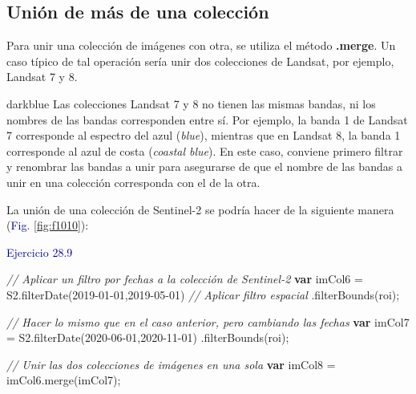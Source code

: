\documentclass[
  12pt,
  letterpaper,
  twoside]{book}
\newenvironment{Shaded}{\begin{snugshade}}{\end{snugshade}}
\newcommand{\CommentTok}[1]{\textcolor[rgb]{0.24,0.58,0.00}{\textit{#1}}}
\newcommand{\FunctionTok}[1]{\textcolor[rgb]{0.48,0.12,0.64}{#1}}
\newcommand{\KeywordTok}[1]{\textcolor[rgb]{0.00,0.00,0.00}{\textbf{#1}}}
\newcommand{\NormalTok}[1]{#1}
\newcommand{\OperatorTok}[1]{\textcolor[rgb]{0.00,0.00,0.00}{#1}}
\newcommand{\StringTok}[1]{\textcolor[rgb]{0.87,0.29,0.22}{#1}}
\newcommand\boldpurple[1]{\textcolor{darkpurple}{\textbf{#1}}}
\begin{document}
\hypertarget{uniuxf3n-de-muxe1s-de-una-colecciuxf3n}{%
\subsection*{Unión de más de una colección}\label{uniuxf3n-de-muxe1s-de-una-colecciuxf3n}}

Para unir una colección de imágenes con otra, se utiliza el método \boldpurple{.merge}. Un caso típico de tal operación sería unir dos colecciones de Landsat, por ejemplo, Landsat 7 y 8.

\begin{bluebox2}

\begin{awesomeblock}{5pt}{\faLightbulb}{darkblue}
Las colecciones Landsat 7 y 8 no tienen las mismas bandas, ni los nombres de las bandas corresponden entre sí. Por ejemplo, la banda 1 de Landsat 7 corresponde al espectro del azul (\emph{blue}), mientras que en Landsat 8, la banda 1 corresponde al azul de costa (\emph{coastal blue}). En este caso, conviene primero filtrar y renombrar las bandas a unir para asegurarse de que el nombre de las bandas a unir en una colección corresponda con el de la otra.

\end{awesomeblock}

\end{bluebox2}

La unión de una colección de Sentinel-2 se podría hacer de la siguiente manera (\textcolor{darkblue}{Fig.} \ref{fig:f1010}):

\textcolor{darkblue}{Ejercicio 28.9}

\begin{Shaded}
\begin{Highlighting}[]
\CommentTok{// Aplicar un filtro por fechas a la colección de Sentinel{-}2}
\KeywordTok{var}\NormalTok{ imCol6 }\OperatorTok{=}\NormalTok{ S2}\OperatorTok{.}\FunctionTok{filterDate}\NormalTok{(}\StringTok{\textquotesingle{}2019{-}01{-}01\textquotesingle{}}\OperatorTok{,}\StringTok{\textquotesingle{}2019{-}05{-}01\textquotesingle{}}\NormalTok{)}
  \CommentTok{// Aplicar filtro espacial}
  \OperatorTok{.}\FunctionTok{filterBounds}\NormalTok{(roi)}\OperatorTok{;}

\CommentTok{// Hacer lo mismo que en el caso anterior, pero cambiando las fechas}
\KeywordTok{var}\NormalTok{ imCol7 }\OperatorTok{=}\NormalTok{ S2}\OperatorTok{.}\FunctionTok{filterDate}\NormalTok{(}\StringTok{\textquotesingle{}2020{-}06{-}01\textquotesingle{}}\OperatorTok{,}\StringTok{\textquotesingle{}2020{-}11{-}01\textquotesingle{}}\NormalTok{)}
  \OperatorTok{.}\FunctionTok{filterBounds}\NormalTok{(roi)}\OperatorTok{;}

\CommentTok{// Unir las dos colecciones de imágenes en una sola  }
\KeywordTok{var}\NormalTok{ imCol8 }\OperatorTok{=}\NormalTok{ imCol6}\OperatorTok{.}\FunctionTok{merge}\NormalTok{(imCol7)}\OperatorTok{;}
\end{Highlighting}
\end{Shaded}
\end{document}
